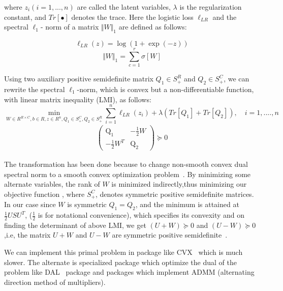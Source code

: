where $z_i (i = 1, . . . , n)$ are called the latent variables, $\lambda$ is the regularization constant, and  $Tr[\bullet]$ denotes the trace. Here the logistic loss $\ell_{LR}$ and the spectral $\ell_1$- norm of a matrix $\Vert W\Vert_1$ are defined as follows:

\begin{equation}
\ell_{LR}\left(z\right)=\log\left(1+\exp\left(-z\right)\right)
\end{equation}
\begin{equation}
\Vert W\Vert_1 = \sum_{c=1}^r \sigma[W]
\end{equation}

Using two auxiliary positive semidefinite matrix $Q_1 \in S_+^R$ and $Q_2 \in S_+^C$, we can rewrite the spectral $\ell_1$-norm, which is convex but a non-differentiable function, with linear matrix inequality (LMI), as follows:
\begin{equation}
\min_{W\in R^{R\times C},b\in R, z\in R^n, Q_1\in S_+^C,Q_2\in S_+^R} \sum_{i=1}^n \ell_{LR}\left(z_i\right)+\lambda \left(Tr[Q_1]+Tr[Q_2]\right), \quad i=1,....,n
\end{equation}
\begin{eqnarray*}
\left(\begin{array}{cc} \mathrm{Q_1} & -\frac{1}{2}W\\ -\frac{\mathrm{1}}{2}W^T & \mathrm{Q_2} \end{array}\right) \succeq 0
\end{eqnarray*}  


The transformation has been done because to change non-smooth convex dual spectral norm to a smooth convex optimization problem~\cite{27}. By minimizing some alternate variables, the rank of $W$ is minimized indirectly,thus minimizing our objective function , where $S_+^C$, denotes symmetric positive semidefinite matrices. In our case since $W$ is symmetric $Q_1= Q_2$, and the minimum is attained at $\frac{1}{2} USU^T$, ($\frac{1}{2}$ is for notational convenience), which specifies its convexity and on finding the determinant of above LMI, we get $(U+W) \succeq 0$ and $(U-W) \succeq 0$,i.e, the matrix $U+W$ and $U-W$ are symmetric positive semidefinite~\cite{21}.

We can implement this primal problem in package like CVX~\cite{28} which is much slower. The alternate is specialized package which optimize the dual of the problem like DAL~\cite{29} package and packages which implement ADMM (alternating direction method of multipliers).